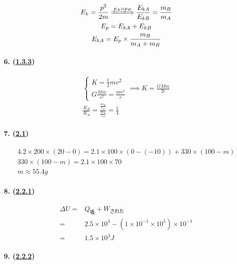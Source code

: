 \begin{gather*}
    E_k=\frac{p^2}{2m}\xLongrightarrow{p_A=p_B}
    \frac{E_{kA}}{E_{kB}}=\frac{m_B}{m_A}\\
    E_p=E_{kA}+E_{kB}\\
    E_{kA}=E_p\times\frac{m_B}{m_A+m_B}
\end{gather*}

\paragraph{6. (\hyperref[subsec:1.3.3]{1.3.3})}

\begin{gather*}
    \begin{cases}
        K=\frac12mv^2\\
        G\frac{Mm}{r^2}=\frac{mv^2}{r}
    \end{cases}\implies
    K=\frac{GMm}{2r}\\
    \frac{K_B}{K_A}=\frac{\frac{m_B}{r_B}}{\frac{m_A}{r_A}}=\frac14
\end{gather*}

\paragraph{7. (\hyperref[sec:2.1]{2.1})}

\begin{gather*}
    4.2\times200\times(20-0)=2.1\times100\times(0-(-10))+330\times(100-m)\\
    330\times(100-m)=2.1\times100\times70\\
    m\approx55.4g
\end{gather*}

\paragraph{8. (\hyperref[subsec:2.2.1]{2.2.1})}

\begin{align*}
    \Delta U=&Q_\textrm{吸}+W_\textrm{された}\\
    =&2.5\times10^3-(1\times10^{-1}\times10^5)\times10^{-1}\\
    =&1.5\times10^3J
\end{align*}

\paragraph{9. (\hyperref[subsec:2.2.2]{2.2.2})}

